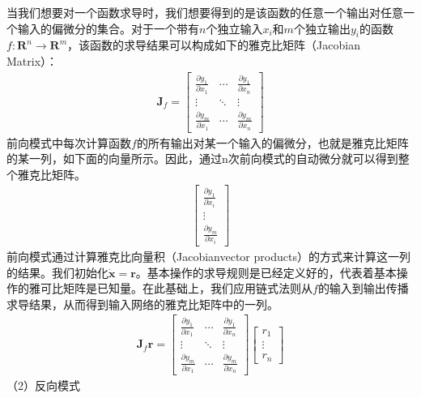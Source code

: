 \documentclass[letterpaper,10pt,english]{sphinxmanual}
\begin{document}
\sphinxAtStartPar
当我们想要对一个函数求导时，我们想要得到的是该函数的任意一个输出对任意一个输入的偏微分的集合。对于一个带有\(n\)个独立输入\(x_i\)和\(m\)个独立输出\(y_i\)的函数\(f:{\mathbf{R}^n}\to \mathbf{R}^m\)，该函数的求导结果可以构成如下的雅克比矩阵（Jacobian
Matrix）：
\begin{equation}\label{equation:chapter_frontend_and_ir/ad:chapter_frontend_and_ir/ad:7}
\begin{split}\mathbf{J}_{f}=
\begin{bmatrix}
    \frac{\partial y_1}{\partial x_1} & \cdots & \frac{\partial y_1}{\partial x_n} \\
    \vdots & \ddots & \vdots \\
    \frac{\partial y_m}{\partial x_1} & \cdots & \frac{\partial y_m}{\partial x_n}
\end{bmatrix}\end{split}
\end{equation}
\sphinxAtStartPar
前向模式中每次计算函数\(f\)的所有输出对某一个输入的偏微分，也就是雅克比矩阵的某一列，如下面的向量所示。因此，通过n次前向模式的自动微分就可以得到整个雅克比矩阵。
\begin{equation}\label{equation:chapter_frontend_and_ir/ad:chapter_frontend_and_ir/ad:8}
\begin{split}\begin{bmatrix}
    \frac{\partial y_1}{\partial x_i} \\
    \vdots \\
    \frac{\partial y_m}{\partial x_i}
\end{bmatrix}\end{split}
\end{equation}
\sphinxAtStartPar
前向模式通过计算雅克比向量积（Jacobian\sphinxhyphen{}vector
products）的方式来计算这一列的结果。我们初始化\(\dot{\mathbf{x}}=\mathbf{r}\)。基本操作的求导规则是已经定义好的，代表着基本操作的雅可比矩阵是已知量。在此基础上，我们应用链式法则从\(f\)的输入到输出传播求导结果，从而得到输入网络的雅克比矩阵中的一列。
\begin{equation}\label{equation:chapter_frontend_and_ir/ad:chapter_frontend_and_ir/ad:9}
\begin{split}\mathbf{J}_{f}\mathbf{r}=
\begin{bmatrix}
    \frac{\partial y_1}{\partial x_1} & \cdots & \frac{\partial y_1}{\partial x_n} \\
    \vdots & \ddots & \vdots \\
    \frac{\partial y_m}{\partial x_1} & \cdots & \frac{\partial y_m}{\partial x_n}
\end{bmatrix}
\begin{bmatrix}
    r_1 \\
    \vdots \\
    r_n
\end{bmatrix}\end{split}
\end{equation}
\sphinxAtStartPar
（2）反向模式
\end{document}

